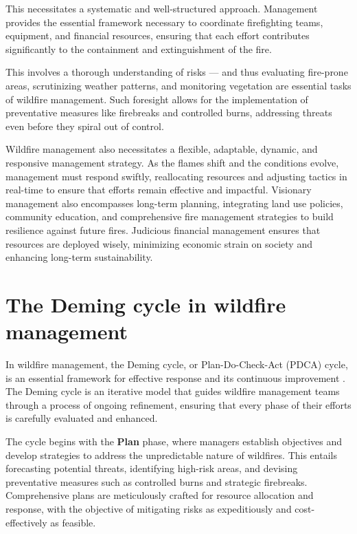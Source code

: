 \documentclass[
  12 pt,
]{Nemilov}
\begin{document}
This necessitates a systematic and well-structured approach. Management provides the essential framework necessary to coordinate firefighting teams, equipment, and financial resources, ensuring that each effort contributes significantly to the containment and extinguishment of the fire.

This involves a thorough understanding of risks --- and thus evaluating fire-prone areas, scrutinizing weather patterns, and monitoring vegetation are essential tasks of wildfire management. Such foresight allows for the implementation of preventative measures like firebreaks and controlled burns, addressing threats even before they spiral out of control.

Wildfire management also necessitates a flexible, adaptable, dynamic, and responsive management strategy. As the flames shift and the conditions evolve, management must respond swiftly, reallocating resources and adjusting tactics in real-time to ensure that efforts remain effective and impactful. Visionary management also encompasses long-term planning, integrating land use policies, community education, and comprehensive fire management strategies to build resilience against future fires. Judicious financial management ensures that resources are deployed wisely, minimizing economic strain on society and enhancing long-term sustainability.

\section{The Deming cycle in wildfire management}\label{the-deming-cycle-in-wildfire-management}

In wildfire management, the Deming cycle, or Plan-Do-Check-Act (PDCA) cycle, is an essential framework for effective response and its continuous improvement \citep{fugate2014focused}. The Deming cycle is an iterative model that guides wildfire management teams through a process of ongoing refinement, ensuring that every phase of their efforts is carefully evaluated and enhanced.

The cycle begins with the \textbf{Plan} phase, where managers establish objectives and develop strategies to address the unpredictable nature of wildfires. This entails forecasting potential threats, identifying high-risk areas, and devising preventative measures such as controlled burns and strategic firebreaks. Comprehensive plans are meticulously crafted for resource allocation and response, with the objective of mitigating risks as expeditiously and cost-effectively as feasible.
\end{document}
